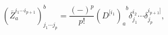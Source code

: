 \begin{equation}
\left( \bar{Z}_{a}^{i_{1}\cdots i_{p+1}}\right) _{j_{1}\cdots j_{p}}^{b}=%
\frac{\left( -\right) ^{p}}{p!}\left( D^{[i_{1}}\right) _{a}^{\;\;b}\delta
_{j_{1}}^{i_{2}}\cdots \delta _{j_{p}}^{i_{p+1}]},  \label{i27}
\end{equation}

